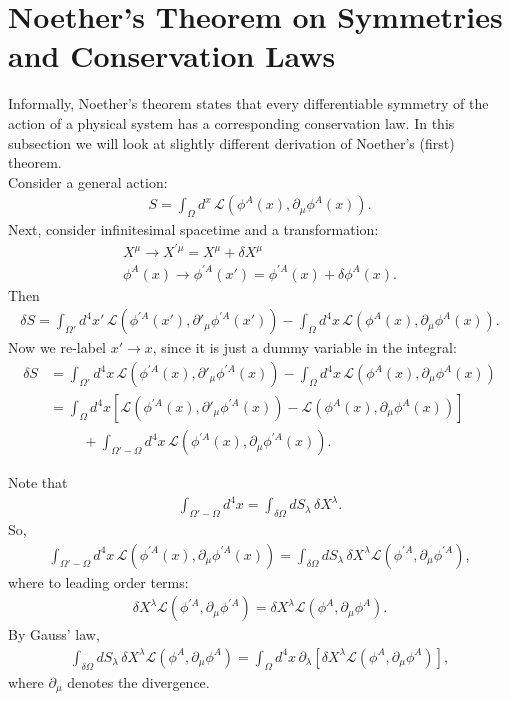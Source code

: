 \documentclass{book}
\numberwithin{equation}{section}
\theoremstyle{definition}
\newcommand{\p}{\partial}
\newcommand{\lag}{\mathcal{L}}
\begin{document}
\section{Noether's Theorem on Symmetries and Conservation Laws}

Informally, Noether's theorem states that every differentiable symmetry of the action of a physical system has a corresponding conservation law. In this subsection we will look at slightly different derivation of Noether's (first) theorem.\\

Consider a general action:
\begin{align}
S = \int_\Omega d^x\, \lag\left( \phi^A(x), \p_\mu \phi^A(x)\right).
\end{align}
Next, consider infinitesimal spacetime and a transformation:
\begin{align}
X^\mu \to X^{'\mu} = X^\mu + \delta X^\mu \nonumber \\
\phi^A(x) \to \phi^{'A}(x') = \phi^{'A}(x) + \delta \phi^{A}(x).
\end{align}
Then
\begin{align}
\delta S = \int_{\Omega'} d^4x'\, \lag\left( \phi^{'A}(x'), \p'_\mu \phi^{'A}(x') \right) - \int_\Omega d^4x\, \lag\left( \phi^A(x), \p_\mu \phi^A(x)\right).
\end{align}
Now we re-label $x' \to x$, since it is just a dummy variable in the integral:
\begin{align}
\delta S &= \int_{\Omega'} d^4x\, \lag\left( \phi^{'A}(x), \p'_\mu \phi^{'A}(x) \right) - \int_\Omega d^4x\, \lag\left( \phi^A(x), \p_\mu\phi^A(x)\right)\nonumber\\
&= \int_\Omega d^4x\left[\lag\left( \phi^{'A}(x), \p'_\mu \phi^{'A}(x) \right) - \lag\left( \phi^A(x), \p_\mu\phi^A(x)\right)\right] \nonumber\\
&\hspace{1cm} + \int_{\Omega' - \Omega} d^4x\, \lag\left(\phi^{'A}(x), \p_\mu\phi^{'A}(x) \right).
\end{align}

Note that
\begin{align}
\int_{\Omega'-\Omega}d^4x = \int_{\delta \Omega} dS_\lambda\,\delta X^\lambda.
\end{align}
So,
\begin{align}
\int_{\Omega' - \Omega} d^4x\, \lag\left(\phi^{'A}(x), \p_\mu\phi^{'A}(x) \right) = \int_{\delta \Omega} dS_\lambda\, \delta X^\lambda \lag\left(\phi^{'A}, \p_\mu \phi^{'A}\right),
\end{align}
where to leading order terms:
\begin{align}
\delta X^\lambda \lag\left(\phi^{'A}, \p_\mu \phi^{'A}\right) = \delta X^\lambda \lag\left(\phi^A, \p_\mu\phi^A\right).
\end{align}
By Gauss' law, 
\begin{align}
\int_{\delta \Omega} dS_\lambda\, \delta X^\lambda \lag\left(\phi^A, \p_\mu \phi^A \right)  = \int_\Omega d^4x\,\p_\lambda \left[ \delta X^\lambda \lag\left(\phi^A, \p_\mu\phi^A\right)\right],
\end{align}
where $\p_\mu$ denotes the divergence.\\
\end{document}
